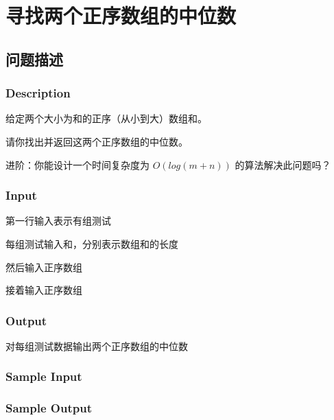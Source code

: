 
\section{寻找两个正序数组的中位数}
\subsection{问题描述}
\subsubsection*{Description}
给定两个大小为和的正序（从小到大）数组和。

请你找出并返回这两个正序数组的中位数。

进阶：你能设计一个时间复杂度为 $O(log (m+n))$ 的算法解决此问题吗？

\subsubsection*{Input}

第一行输入表示有组测试

每组测试输入和，分别表示数组和的长度

然后输入正序数组

接着输入正序数组

\subsubsection*{Output}

对每组测试数据输出两个正序数组的中位数

\subsubsection*{Sample Input}








\subsubsection*{Sample Output}



